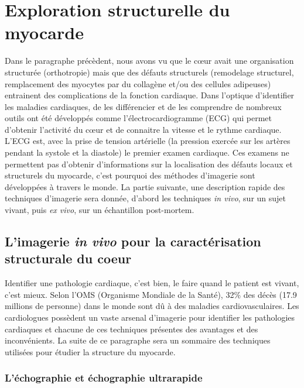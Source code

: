 \section{Exploration structurelle du myocarde }
Dans le paragraphe précèdent, nous avons vu que le cœur avait une organisation structurée (orthotropie) mais que des défauts structurels (remodelage structurel, remplacement des myocytes par du collagène et/ou des cellules adipeuses) entrainent des complications de la fonction cardiaque. Dans l’optique d’identifier les maladies cardiaques, de les différencier et de les comprendre de nombreux outils ont été développés comme l’électrocardiogramme (ECG) qui permet d’obtenir l’activité du cœur et de connaitre la vitesse et le rythme cardiaque. L’ECG est, avec la prise de tension artérielle (la pression exercée sur les artères pendant la systole et la diastole) le premier examen cardiaque. Ces examens ne permettent pas d’obtenir d’informations sur la localisation des défauts locaux et structurels du myocarde, c’est pourquoi des méthodes d’imagerie sont développées à travers le monde. La partie suivante, une description rapide des techniques d’imagerie sera donnée, d’abord les techniques \textit{in vivo}, sur un sujet vivant, puis \textit{ex vivo}, sur un échantillon post-mortem. 


\subsection{L'imagerie \textit{in vivo} pour la caractérisation structurale du coeur}

Identifier une pathologie cardiaque, c’est bien, le faire quand le patient est vivant, c’est mieux. Selon l’OMS (Organisme Mondiale de la Santé), 32\% des décès (17.9 millions de personne)  dans le monde sont dû à des maladies cardiovasculaires. Les cardiologues possèdent un vaste arsenal d’imagerie pour identifier les pathologies cardiaques et chacune de ces techniques présentes des avantages et des inconvénients. La suite de ce paragraphe sera un sommaire des techniques utilisées pour étudier la structure du myocarde.

\subsubsection{L’échographie et échographie ultrarapide}

